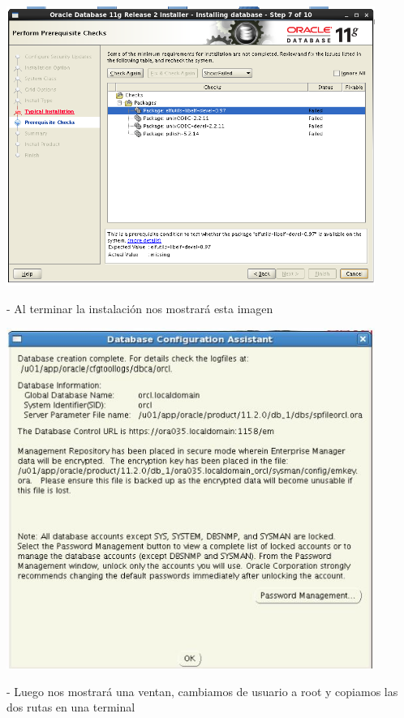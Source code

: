 \documentclass[12pt,letterpaper]{article}
\begin{document}
\begin{center}
	\includegraphics[width=12cm]{./Imagenes/32} 
\end{center}

\begin{itemize}
- Al terminar la instalación nos mostrará esta imagen \\
\end{itemize}

\begin{center}
	\includegraphics[width=12cm]{./Imagenes/33} 
\end{center}


\begin{itemize}
- Luego nos mostrará una ventan, cambiamos de usuario a root y copiamos las dos rutas en una terminal \\
\end{itemize}
\end{document}

